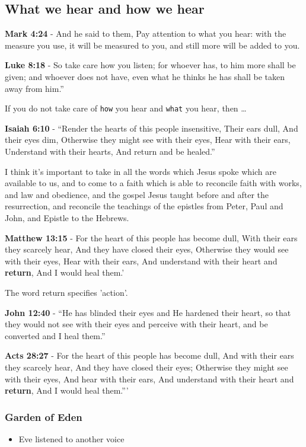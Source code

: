 \documentclass[11pt]{article}
\begin{document}
\subsection{What we hear and how we hear}
\label{sec:org6a2427d}
\textbf{Mark 4:24} - And he said to them, Pay attention to what you hear: with the measure you use, it will be measured to you, and still more will be added to you.

\textbf{Luke 8:18} - So take care how you listen; for whoever has, to him more shall be given; and whoever does not have, even what he thinks he has shall be taken away from him.”

If you do not take care of \texttt{how} you hear and \texttt{what} you hear, then \ldots{}

\textbf{Isaiah 6:10} - “Render the hearts of this people insensitive, Their ears dull, And their eyes dim, Otherwise they might see with their eyes, Hear with their ears, Understand with their hearts, And return and be healed.”

I think it's important to take in all the words which Jesus spoke which are available to us, and to come to a faith which is able to reconcile faith with works, and law and obedience, and the gospel Jesus taught before and after the resurrection, and reconcile the teachings of the epistles from Peter, Paul and John, and Epistle to the Hebrews.

\textbf{Matthew 13:15} - For the heart of this people has become dull, With their ears they scarcely hear, And they have closed their eyes, Otherwise they would see with their eyes, Hear with their ears, And understand with their heart and \textbf{return}, And I would heal them.’

The word return specifies 'action'.

\textbf{John 12:40} - “He has blinded their eyes and He hardened their heart, so that they would not see with their eyes and perceive with their heart, and be converted and I heal them.”

\textbf{Acts 28:27} - For the heart of this people has become dull, And with their ears they scarcely hear, And they have closed their eyes; Otherwise they might see with their eyes, And hear with their ears, And understand with their heart and \textbf{return}, And I would heal them.”’

\subsubsection{Garden of Eden}
\label{sec:org6129981}
\begin{itemize}
\item Eve listened to another voice
\end{itemize}
\end{document}
